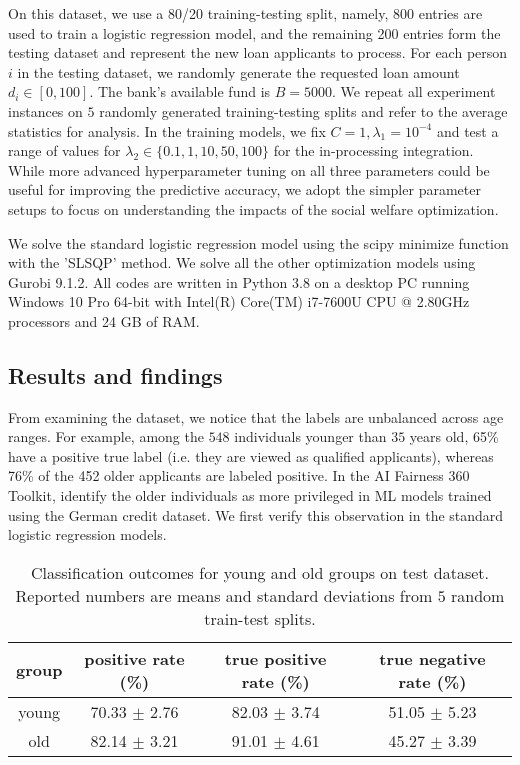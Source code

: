\documentclass{article}[11pt]
\begin{document}
On this dataset, we use a 80/20 training-testing split, namely, 800 entries are used to train a logistic regression model, and the remaining 200 entries form the testing dataset and represent the new loan applicants to process. For each person $i$ in the testing dataset, we randomly generate the requested loan amount $d_i \in [0,100]$. The bank's available fund is $B=5000$. We repeat all experiment instances on $5$ randomly generated training-testing splits and refer to the average statistics for analysis. In the training models, we fix $C=1, \lambda_1=10^{-4}$ and test a range of values for $\lambda_2 \in \{0.1,1,10,50,100\}$ for the in-processing integration. While more advanced hyperparameter tuning on all three parameters could be useful for improving the predictive accuracy, we adopt the simpler parameter setups to focus on understanding the impacts of the social welfare optimization.

We solve the standard logistic regression model using the scipy minimize function with the 'SLSQP' method. We solve all the other optimization models %
using Gurobi 9.1.2. All codes are written in Python 3.8 on a desktop PC running Windows 10 Pro 64-bit with Intel(R) Core(TM) i7-7600U CPU @ 2.80GHz processors and 24 GB of RAM. 

\subsection{Results and findings}
From examining the dataset, we notice that the labels are unbalanced across age ranges. For example, among the $548$ individuals younger than $35$ years old, 65\% have a positive true label (i.e. they are viewed as qualified applicants), whereas 76\% of the 452 older applicants are labeled positive. 
In the AI Fairness 360 Toolkit, \cite{bellamy2018ai} identify the older individuals as more privileged in ML models trained using the German credit dataset. We first verify this observation in the standard logistic regression models. 
\begin{table}
    \centering
    \begin{tabular}{c|c|c|c} \toprule
    group & positive rate (\%) & true positive rate (\%) & true negative rate (\%) \\ \hline
      young &  70.33 $\pm$ 2.76 & 82.03 $\pm$ 3.74 & 51.05 $\pm$ 5.23 \\ \hline
      old   &  82.14 $\pm$ 3.21 & 91.01 $\pm$ 4.61 & 45.27 $\pm$ 3.39 \\ \bottomrule
    \end{tabular}
    \caption{\small{Classification outcomes for young and old groups on test dataset. Reported numbers are means and standard deviations from $5$ random train-test splits. 
    }}
    \label{tab:lr-outcome}
\end{table}
\end{document}
